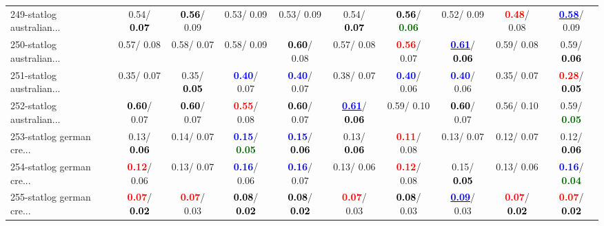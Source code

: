\begin{table}[h]
\begin{center}
{\begin{tabular}{lc|c|c|c|c|c|c|c|c}
249-statlog australian... &   0.54/\textcolor{black}{\textbf{  0.07}} & \textcolor{black}{\textbf{  0.56}}/  0.09 &   0.53/  0.09 &   0.53/  0.09 &   0.54/\textcolor{black}{\textbf{  0.07}} & \textcolor{black}{\textbf{  0.56}}/\textcolor{darkgreen}{\textbf{  0.06}} &   0.52/  0.09 & \textcolor{red}{\textbf{  0.48}}/  0.08 & \underline{\textcolor{blue}{\textbf{  0.58}}}/  0.09 \\
250-statlog australian... &   0.57/  0.08 &   0.58/  0.07 &   0.58/  0.09 & \textcolor{black}{\textbf{  0.60}}/  0.08 &   0.57/  0.08 & \textcolor{red}{\textbf{  0.56}}/  0.07 & \underline{\textcolor{blue}{\textbf{  0.61}}}/\textcolor{black}{\textbf{  0.06}} &   0.59/  0.08 &   0.59/\textcolor{black}{\textbf{  0.06}} \\
251-statlog australian... &   0.35/  0.07 &   0.35/\textcolor{black}{\textbf{  0.05}} & \textcolor{blue}{\textbf{  0.40}}/  0.07 & \textcolor{blue}{\textbf{  0.40}}/  0.07 &   0.38/  0.07 & \textcolor{blue}{\textbf{  0.40}}/  0.06 & \textcolor{blue}{\textbf{  0.40}}/  0.06 &   0.35/  0.07 & \textcolor{red}{\textbf{  0.28}}/\textcolor{black}{\textbf{  0.05}} \\
252-statlog australian... & \textcolor{black}{\textbf{  0.60}}/  0.07 & \textcolor{black}{\textbf{  0.60}}/  0.07 & \textcolor{red}{\textbf{  0.55}}/  0.08 & \textcolor{black}{\textbf{  0.60}}/  0.07 & \underline{\textcolor{blue}{\textbf{  0.61}}}/\textcolor{black}{\textbf{  0.06}} &   0.59/  0.10 & \textcolor{black}{\textbf{  0.60}}/  0.07 &   0.56/  0.10 &   0.59/\textcolor{darkgreen}{\textbf{  0.05}} \\ \hline
253-statlog german cre... &   0.13/\textcolor{black}{\textbf{  0.06}} &   0.14/  0.07 & \textcolor{blue}{\textbf{  0.15}}/\textcolor{darkgreen}{\textbf{  0.05}} & \textcolor{blue}{\textbf{  0.15}}/\textcolor{black}{\textbf{  0.06}} &   0.13/\textcolor{black}{\textbf{  0.06}} & \textcolor{red}{\textbf{  0.11}}/  0.08 &   0.13/  0.07 &   0.12/  0.07 &   0.12/\textcolor{black}{\textbf{  0.06}} \\
254-statlog german cre... & \textcolor{red}{\textbf{  0.12}}/  0.06 &   0.13/  0.07 & \textcolor{blue}{\textbf{  0.16}}/  0.06 & \textcolor{blue}{\textbf{  0.16}}/  0.07 &   0.13/  0.06 & \textcolor{red}{\textbf{  0.12}}/  0.08 &   0.15/\textcolor{black}{\textbf{  0.05}} &   0.13/  0.06 & \textcolor{blue}{\textbf{  0.16}}/\textcolor{darkgreen}{\textbf{  0.04}} \\
255-statlog german cre... & \textcolor{red}{\textbf{  0.07}}/\textcolor{black}{\textbf{  0.02}} & \textcolor{red}{\textbf{  0.07}}/  0.03 & \textcolor{black}{\textbf{  0.08}}/\textcolor{black}{\textbf{  0.02}} & \textcolor{black}{\textbf{  0.08}}/\textcolor{black}{\textbf{  0.02}} & \textcolor{red}{\textbf{  0.07}}/  0.03 & \textcolor{black}{\textbf{  0.08}}/  0.03 & \underline{\textcolor{blue}{\textbf{  0.09}}}/  0.03 & \textcolor{red}{\textbf{  0.07}}/\textcolor{black}{\textbf{  0.02}} & \textcolor{red}{\textbf{  0.07}}/\textcolor{black}{\textbf{  0.02}} \\

\end{tabular}}
\end{center}
\end{table}
